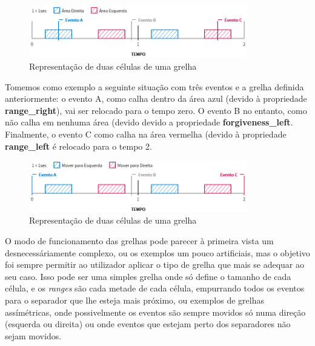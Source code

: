 \begin{figure}[h]
\begin{center}
    \includegraphics[width=0.85\textwidth]{img/grids_3_1.png}
\end{center}
\vspace*{-5mm}
\caption{Representação de duas células de uma grelha}
\label{fig:grids-3-1}
\end{figure}

Tomemos como exemplo a seguinte situação com três eventos e a grelha definida anteriormente: o evento A, como calha dentro da área azul (devido à propriedade \textbf{range\_right}), vai ser relocado para o tempo zero. O evento B no entanto, como não calha em nenhuma área (devido devido a propriedade \textbf{forgiveness\_left}. Finalmente, o evento C como calha na área vermelha (devido à propriedade \textbf{range\_left} é relocado para o tempo 2.

\begin{figure}[h]
\begin{center}
    \includegraphics[width=0.85\textwidth]{img/grids_3_2.png}
\end{center}
\vspace*{-5mm}
\caption{Representação de duas células de uma grelha}
\label{fig:grids-3-2}
\end{figure}

O modo de funcionamento das grelhas pode parecer à primeira vista um desnecessáriamente complexo, ou os exemplos um pouco artificiais, mas o objetivo foi sempre permitir ao utilizador aplicar o tipo de grelha que mais se adequar ao seu caso. Isso pode ser uma simples grelha onde só define o tamanho de cada célula, e os \textit{ranges} são cada metade de cada célula, empurrando todos os eventos para o separador que lhe esteja mais próximo, ou exemplos de grelhas assímétricas, onde possivelmente os eventos são sempre movidos só numa direção (esquerda ou direita) ou onde eventos que estejam perto dos separadores não sejam movidos.

